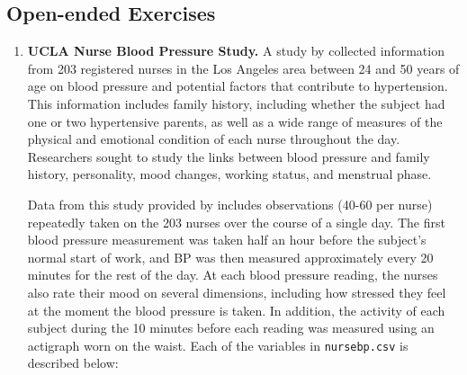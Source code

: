 \documentclass[
]{krantz}
\begin{document}
\hypertarget{open-ended-exercises-1}{%
\subsection{Open-ended Exercises}\label{open-ended-exercises-1}}

\begin{enumerate}
\def\labelenumi{\arabic{enumi}.}
\item
  \textbf{UCLA Nurse Blood Pressure Study.} A study by \citet{Goldstein2000} collected information from 203 registered nurses in the Los Angeles area between 24 and 50 years of age on blood pressure and potential factors that contribute to hypertension. This information includes family history, including whether the subject had one or two hypertensive parents, as well as a wide range of measures of the physical and emotional condition of each nurse throughout the day. Researchers sought to study the links between blood pressure and family history, personality, mood changes, working status, and menstrual phase.

  Data from this study provided by \citet{Weiss2005} includes observations (40-60 per nurse) repeatedly taken on the 203 nurses over the course of a single day. The first blood pressure measurement was taken half an hour before the subject's normal start of work, and BP was then measured approximately every 20 minutes for the rest of the day. At each blood pressure reading, the nurses also rate their mood on several dimensions, including how stressed they feel at the moment the blood pressure is taken. In addition, the activity of each subject during the 10 minutes before each reading was measured using an actigraph worn on the waist. Each of the variables in \texttt{nursebp.csv} is described below:


\end{enumerate}
\end{document}
